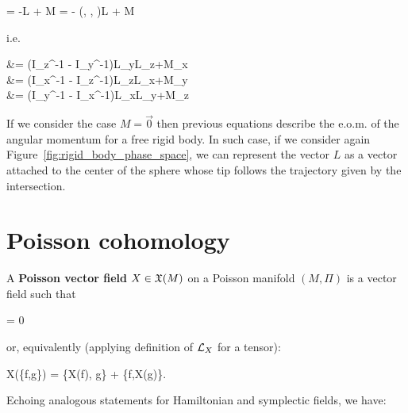 \documentclass[main.tex]{subfiles}
\begin{document}
\begin{example}
	\begin{eqalign}
		 = -\omega\times L + M = - \left(, ,  \right)\times L + M
	\end{eqalign}
	i.e.
	\begin{eqalign}
		 &= (I_z^{-1} - I_y^{-1})L_yL_z+M_x\\
		 &= (I_x^{-1} - I_z^{-1})L_zL_x+M_y\\
		 &= (I_y^{-1} - I_x^{-1})L_xL_y+M_z
	\end{eqalign}
	If we consider the case $M=\vec 0$ then previous equations describe the e.o.m. of the angular momentum for a free rigid body.  In such case, if we consider again Figure~\ref{fig:rigid_body_phase_space}, we can represent the vector $L$ as a vector attached to the center of the sphere whose tip follows the trajectory given by the intersection.  
\end{example}

\section{Poisson cohomology}
\begin{definition}
	A \textbf{Poisson vector field} $X \in \mathfrak{X}(M)$ on a Poisson manifold $(M, \Pi)$ is a vector field such that
	\begin{eqalign}
		 \Pi = 0
	\end{eqalign}
	or, equivalently (applying definition of $\mathcal{L}_{X}$ for a tensor):
	\begin{eqalign}
		X(\{f,g\}) = \{X(f), g\} + \{f,X(g)\}.
	\end{eqalign}
\end{definition}

Echoing analogous statements for Hamiltonian and symplectic fields, we have:
\end{document}
